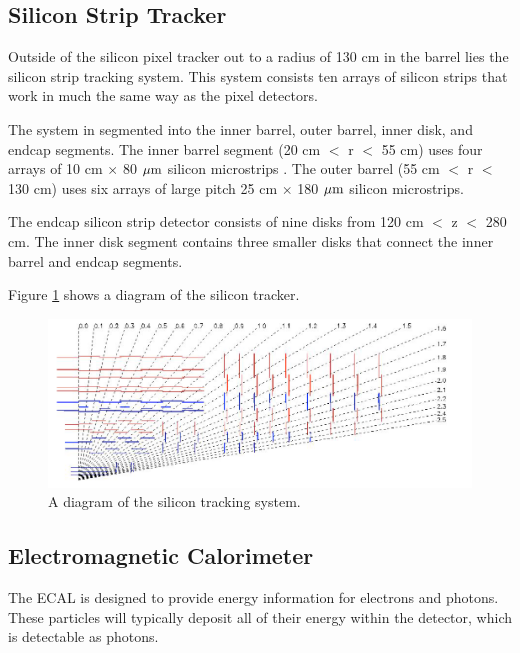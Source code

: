 \subsection{Silicon Strip Tracker}
Outside of the silicon pixel tracker out to a radius of 130 cm in the barrel lies the silicon strip tracking system.  
This system consists ten arrays of silicon strips that work in much the same way as the pixel detectors.  

The system in segmented into the inner barrel, outer barrel, inner disk, and endcap segments.  
The inner barrel segment (20 cm $<$ r $<$ 55 cm) uses four arrays of 10 cm $\times$ 80 $\mathrm{\mu m}$ silicon microstrips .  
The outer barrel (55 cm  $<$ r $<$ 130 cm) uses six arrays of large pitch 25 cm $\times$ 180 $\mathrm{\mu m}$ silicon microstrips.  

The endcap silicon strip detector consists of nine disks from 120 cm  $<$ z $<$ 280 cm.  
The inner disk segment contains three smaller disks that connect the inner barrel and endcap segments.  

Figure \ref{figs:CMStracker} shows a diagram of the silicon tracker.    

\begin{figure}
\begin{center}
\includegraphics[width=1.0\linewidth]{figs/CMStracker.png}
\caption{A diagram of the silicon tracking system.}
\label{figs:CMStracker}
\end{center}
\end{figure}
  


\subsection{Electromagnetic Calorimeter}
The ECAL is designed to provide energy information for electrons and photons.  
These particles will typically deposit all of their energy within the detector, which is detectable as photons. 

